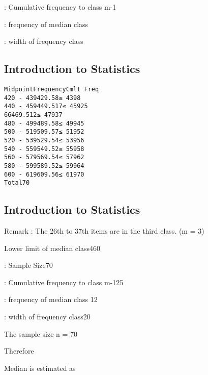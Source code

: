 \documentclass[]{report}
\begin{document}
:    Cumulative frequency to class m-1

:   frequency of median class 

:   width of frequency class


\subsection{Introduction to Statistics}

\begin{verbatim}
MidpointFrequencyCmlt Freq
420 - 439429.58≤ 4398
440 - 459449.517≤ 45925
66469.512≤ 47937 
480 - 499489.58≤ 49945
500 - 519509.57≤ 51952
520 - 539529.54≤ 53956
540 - 559549.52≤ 55958
560 - 579569.54≤ 57962
580 - 599589.52≤ 59964
600 - 619609.56≤ 61970
Total70
\end{verbatim}

\subsection{Introduction to Statistics}





Remark : The 26th to 37th items are in the third class.
(m = 3)

Lower limit of median class460

:      Sample Size70

:    Cumulative frequency to class m-125

:   frequency of median class 12

:   width of frequency class20

The sample size n = 70

Therefore  

Median is estimated as 







\end{document}
